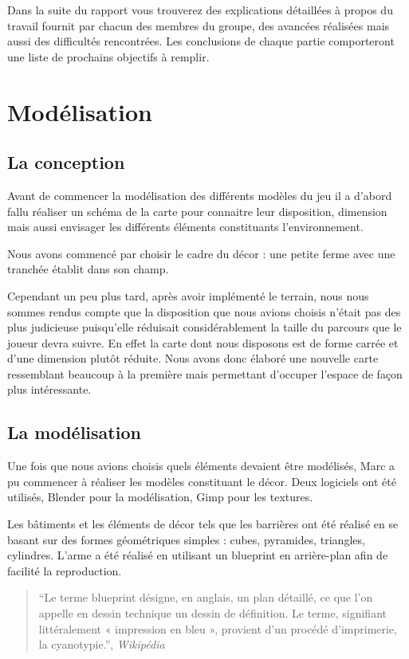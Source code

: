 \documentclass[11pt]{report}
\begin{document}
Dans la suite du rapport vous trouverez des explications détaillées à propos du travail fournit par chacun des membres du groupe, des avancées réalisées mais aussi des difficultés rencontrées.
Les conclusions de chaque partie comporteront une liste de prochains objectifs à remplir.

\newpage
\section{Modélisation}

\subsection{La conception}

Avant de commencer la modélisation des différents modèles du jeu il a d’abord fallu réaliser un schéma de la carte pour connaitre leur disposition, dimension mais aussi envisager les différents éléments constituants l’environnement.

Nous avons commencé par choisir le cadre du décor : une petite ferme avec une tranchée établit dans son champ.

Cependant un peu plus tard, après avoir implémenté le terrain, nous nous sommes rendus compte que la disposition que nous avions choisis n’était pas des plus judicieuse puisqu’elle réduisait considérablement la taille du parcours que le joueur devra suivre. En effet la carte dont nous disposons est de forme carrée et d’une dimension plutôt réduite. Nous avons donc élaboré une nouvelle carte ressemblant beaucoup à la première mais permettant d’occuper l’espace de façon plus intéressante.

\subsection{La modélisation}

Une fois que nous avions choisis quels éléments devaient être modélisés, Marc a pu commencer à réaliser les modèles constituant le décor. Deux logiciels ont été utilisés, Blender pour la modélisation, Gimp pour les textures.

Les bâtiments et les éléments de décor tels que les barrières ont été réalisé en se basant sur des formes géométriques simples : cubes, pyramides, triangles, cylindres. L’arme a été réalisé en utilisant un blueprint en arrière-plan afin de facilité la reproduction.

\begin{quote}
``Le terme blueprint désigne, en anglais, un plan détaillé, ce que l'on appelle en dessin technique un dessin de définition. Le terme, signifiant littéralement « impression en bleu », provient d'un procédé d'imprimerie, la cyanotypie.'', \emph{Wikipédia}
\end{quote}
\end{document}
